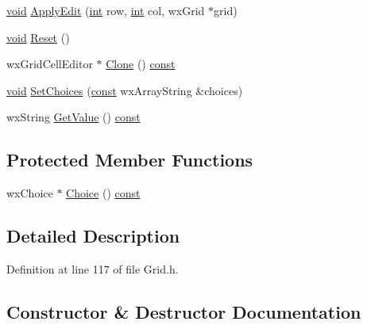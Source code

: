 \begin{DoxyCompactItemize}
\item 
\hyperlink{sound_8c_ae35f5844602719cf66324f4de2a658b3}{void} \hyperlink{class_choice_editor_a490217705b297cbc015163c4e42a0d71}{Apply\+Edit} (\hyperlink{xmltok_8h_a5a0d4a5641ce434f1d23533f2b2e6653}{int} row, \hyperlink{xmltok_8h_a5a0d4a5641ce434f1d23533f2b2e6653}{int} col, wx\+Grid $\ast$grid)
\item 
\hyperlink{sound_8c_ae35f5844602719cf66324f4de2a658b3}{void} \hyperlink{class_choice_editor_aed5cac5ce2d403de17717f7491aba5f7}{Reset} ()
\item 
wx\+Grid\+Cell\+Editor $\ast$ \hyperlink{class_choice_editor_aa3003e88af997780b5aaf601a49cecfb}{Clone} () \hyperlink{getopt1_8c_a2c212835823e3c54a8ab6d95c652660e}{const} 
\item 
\hyperlink{sound_8c_ae35f5844602719cf66324f4de2a658b3}{void} \hyperlink{class_choice_editor_af1bc7bdb776e4dcfb00d44c20092dde2}{Set\+Choices} (\hyperlink{getopt1_8c_a2c212835823e3c54a8ab6d95c652660e}{const} wx\+Array\+String \&choices)
\item 
wx\+String \hyperlink{class_choice_editor_acd0ee117ba302cbb8dc5f595a268f119}{Get\+Value} () \hyperlink{getopt1_8c_a2c212835823e3c54a8ab6d95c652660e}{const} 
\end{DoxyCompactItemize}
\subsection*{Protected Member Functions}
\begin{DoxyCompactItemize}
\item 
wx\+Choice $\ast$ \hyperlink{class_choice_editor_a8a8837b3653c3ad0887bb5cd6a3adbb3}{Choice} () \hyperlink{getopt1_8c_a2c212835823e3c54a8ab6d95c652660e}{const} 
\end{DoxyCompactItemize}


\subsection{Detailed Description}


Definition at line 117 of file Grid.\+h.



\subsection{Constructor \& Destructor Documentation}
